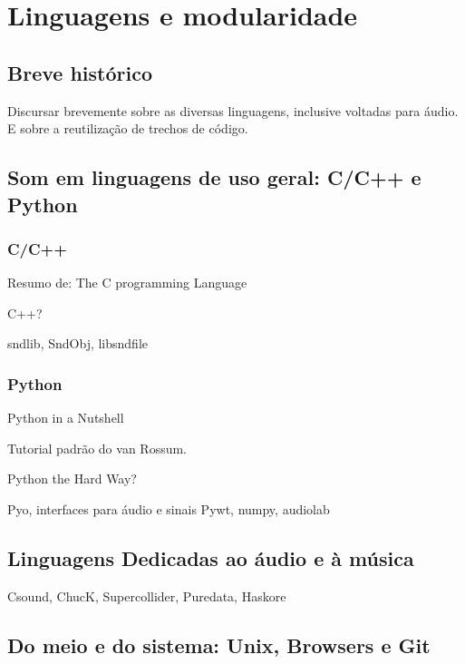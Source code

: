 \section{Linguagens e modularidade}

  \subsection{Breve histórico}

  Discursar brevemente sobre as diversas linguagens,
  inclusive voltadas para áudio. E sobre a reutilização
  de trechos de código.

  \subsection{Som em linguagens de uso geral: C/C++ e Python}

      \subsubsection{C/C++}

      Resumo de:
      The C programming Language

      C++?

      sndlib, SndObj, libsndfile

      \subsubsection{Python}

      Python in a Nutshell

      Tutorial padrão do van Rossum.

      Python the Hard Way?

      Pyo, interfaces para áudio e sinais Pywt, numpy, audiolab

  \subsection{Linguagens Dedicadas ao áudio e à música}
Csound, ChucK, Supercollider, Puredata, Haskore
  

  \subsection{Do meio e do sistema: Unix, Browsers e Git}

